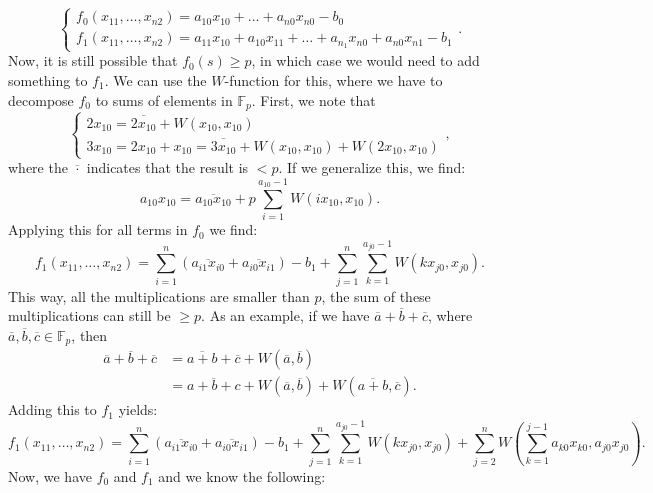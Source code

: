 \documentclass{article}
\begin{document}
\begin{equation}
\begin{cases}
  f_0(x_{11}, \dots, x_{n2}) = a_{10} x_{10} + \dots + a_{n0} x_{n0} - b_0 \\
  f_1(x_{11}, \dots, x_{n 2}) = a_{11} x_{10} + a_{10}x_{11} + \dots + a_{n_1}
  x_{n0} + a_{n 0} x_{n 1} - b_1
\end{cases}.
\end{equation} 
Now, it is still possible that $f_0(s) \ge p$, in which case we would need to add
something to $f_1$. We can use the $W$-function for this, where we have to
decompose $f_0$ to sums of elements in $\mathbb F_p$. First, we note that 
\begin{equation}
  \begin{cases}
    2 x_{10} = \overline{2 x_{10}} + W(x_{10}, x_{10}) \\
    3 x_{10} = 2x_{10} + x_{10} = \overline{3 x_{10}} + W(x_{10}, x_{10}) +
    W(2x_{10}, x_{10})
  \end{cases},
\end{equation} 
where the $\overline{\cdot}$ indicates that the result is $< p$. If we
generalize this, we find: 
\begin{equation}
a_{10} x_{10} = \overline{a_{10} x_{10}} + p\sum_{i = 1}^{a_{10} - 1} W\left( i
x_{10}, x_{10} \right).
\end{equation} 
Applying this for all terms in $f_0$ we find:
\begin{equation}
  f_1(x_{11}, \dots, x_{n 2}) = \sum_{i = 1}^{n}  (\overline{a_{i1} x_{i0}} +
  \overline{a_{i 0} x_{i
  1}}) - b_1 + \sum_{j = 1}^{n} \sum_{k = 1}^{a_{j 0} - 1}   W(k x_{j 0}, x_{j
  0}).
\end{equation} 
This way, all the multiplications are smaller than $p$, the sum of these
multiplications can still be $\ge p$. As an example, if we have $\overline{a} +
\overline{b} + \overline{c}$, where $\overline{a}, \overline{b}, \overline{c}
\in \mathbb F_p$, then 
\begin{equation}
  \begin{split}
    \overline{a} + \overline{b} + \overline{c} &= \overline{a + b} + \overline{c} +
    W(\overline{a}, \overline{b}) \\
    &= \overline{a + b + c} +
    W(\overline{a}, \overline{b}) +
    W(\overline{a + b}, \overline{c}).
  \end{split}
\end{equation}
Adding this to $f_1$ yields:
\begin{equation}
  f_1(x_{11}, \dots, x_{n 2}) = \sum_{i = 1}^{n}  (\overline{a_{i1} x_{i0}} +
  \overline{a_{i 0} x_{i
  1}}) - b_1 + \sum_{j = 1}^{n} \sum_{k = 1}^{a_{j 0} - 1}   W(k x_{j 0}, x_{j
  0}) + \sum_{j = 2}^{n} W \left( \sum_{k = 1}^{j - 1} a_{k 0} x_{k 0}, a_{j
  0} x_{j 0} \right).
\end{equation} 
Now, we have $f_0$ and $f_1$ and we know the following:
\end{document}
